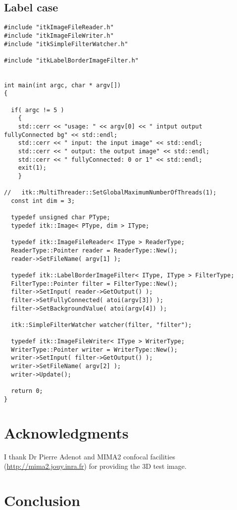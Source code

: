 \documentclass{InsightArticle}
\begin{document}
\subsection{Label case}
\small \begin{verbatim}
#include "itkImageFileReader.h"
#include "itkImageFileWriter.h"
#include "itkSimpleFilterWatcher.h"

#include "itkLabelBorderImageFilter.h"


int main(int argc, char * argv[])
{

  if( argc != 5 )
    {
    std::cerr << "usage: " << argv[0] << " intput output fullyConnected bg" << std::endl;
    std::cerr << " input: the input image" << std::endl;
    std::cerr << " output: the output image" << std::endl;
    std::cerr << " fullyConnected: 0 or 1" << std::endl;
    exit(1);
    }

//   itk::MultiThreader::SetGlobalMaximumNumberOfThreads(1);
  const int dim = 3;
  
  typedef unsigned char PType;
  typedef itk::Image< PType, dim > IType;

  typedef itk::ImageFileReader< IType > ReaderType;
  ReaderType::Pointer reader = ReaderType::New();
  reader->SetFileName( argv[1] );

  typedef itk::LabelBorderImageFilter< IType, IType > FilterType;
  FilterType::Pointer filter = FilterType::New();
  filter->SetInput( reader->GetOutput() );
  filter->SetFullyConnected( atoi(argv[3]) );
  filter->SetBackgroundValue( atoi(argv[4]) );

  itk::SimpleFilterWatcher watcher(filter, "filter");

  typedef itk::ImageFileWriter< IType > WriterType;
  WriterType::Pointer writer = WriterType::New();
  writer->SetInput( filter->GetOutput() );
  writer->SetFileName( argv[2] );
  writer->Update();

  return 0;
}
\end{verbatim} \normalsize

\section{Acknowledgments}
I thank Dr Pierre Adenot and MIMA2 confocal facilities
(\url{http://mima2.jouy.inra.fr}) for providing the 3D test image.

\section{Conclusion}
\end{document}
